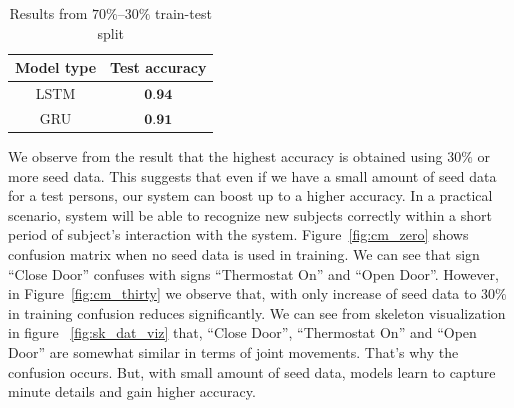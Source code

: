 \documentclass[10pt,twocolumn,letterpaper]{article}
\begin{document}
\begin{table}[h]
	\begin{center}
		\begin{tabular}{|c|c|}
			\hline
			Model type & Test accuracy\\
			\hline\hline
			LSTM & $\textbf{0.94}$\\
			\hline
			GRU & $\textbf{0.91}$\\
			\hline
		\end{tabular}
	\end{center}
	\caption{Results from $70\%$--$30\%$ train-test split}
	\label{table:result_conv}
\end{table}
%		
We observe from the result that the highest accuracy is obtained using $30\%$ or more seed data. This suggests that even if we have a small amount of seed data for a test persons, our system can boost up to a higher accuracy. In a practical scenario, system will be able to recognize new subjects correctly within a short period of subject's interaction with the system. 
Figure~\ref{fig:cm_zero} shows confusion matrix when no seed data is used in training. We can see that sign ``Close Door'' confuses with signs ``Thermostat On'' and ``Open Door''. However, in Figure~\ref{fig:cm_thirty} we observe that, with only increase of seed data to $30\%$ in training confusion reduces significantly. We can see from skeleton visualization in figure ~\ref{fig:sk_dat_viz} that, ``Close Door'', ``Thermostat On'' and ``Open Door'' are somewhat similar in terms of joint movements. That's why the confusion occurs. But, with small amount of seed data, models learn to capture minute details and gain higher accuracy.
\end{document}
